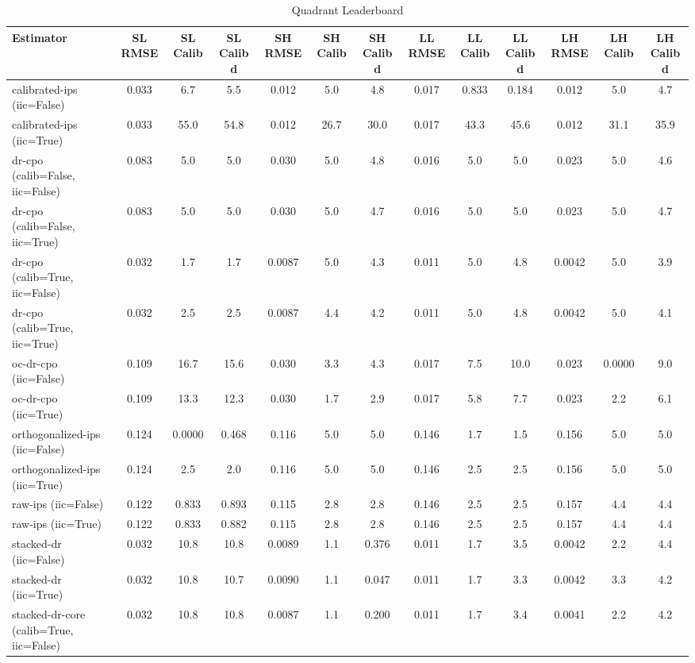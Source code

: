 \begin{table}[htbp]
\centering
\caption{Quadrant Leaderboard}
\label{tab:A1}
\begin{tabular}{l|cccccccccccc}
\toprule
Estimator & SL RMSE & SL Calib & SL Calib d & SH RMSE & SH Calib & SH Calib d & LL RMSE & LL Calib & LL Calib d & LH RMSE & LH Calib & LH Calib d \\
\midrule
calibrated-ips (iic=False) & 0.033 & 6.7 & 5.5 & 0.012 & 5.0 & 4.8 & 0.017 & 0.833 & 0.184 & 0.012 & 5.0 & 4.7 \\
calibrated-ips (iic=True) & 0.033 & 55.0 & 54.8 & 0.012 & 26.7 & 30.0 & 0.017 & 43.3 & 45.6 & 0.012 & 31.1 & 35.9 \\
dr-cpo (calib=False, iic=False) & 0.083 & 5.0 & 5.0 & 0.030 & 5.0 & 4.8 & 0.016 & 5.0 & 5.0 & 0.023 & 5.0 & 4.6 \\
dr-cpo (calib=False, iic=True) & 0.083 & 5.0 & 5.0 & 0.030 & 5.0 & 4.7 & 0.016 & 5.0 & 5.0 & 0.023 & 5.0 & 4.7 \\
dr-cpo (calib=True, iic=False) & 0.032 & 1.7 & 1.7 & 0.0087 & 5.0 & 4.3 & 0.011 & 5.0 & 4.8 & 0.0042 & 5.0 & 3.9 \\
dr-cpo (calib=True, iic=True) & 0.032 & 2.5 & 2.5 & 0.0087 & 4.4 & 4.2 & 0.011 & 5.0 & 4.8 & 0.0042 & 5.0 & 4.1 \\
oc-dr-cpo (iic=False) & 0.109 & 16.7 & 15.6 & 0.030 & 3.3 & 4.3 & 0.017 & 7.5 & 10.0 & 0.023 & 0.0000 & 9.0 \\
oc-dr-cpo (iic=True) & 0.109 & 13.3 & 12.3 & 0.030 & 1.7 & 2.9 & 0.017 & 5.8 & 7.7 & 0.023 & 2.2 & 6.1 \\
orthogonalized-ips (iic=False) & 0.124 & 0.0000 & 0.468 & 0.116 & 5.0 & 5.0 & 0.146 & 1.7 & 1.5 & 0.156 & 5.0 & 5.0 \\
orthogonalized-ips (iic=True) & 0.124 & 2.5 & 2.0 & 0.116 & 5.0 & 5.0 & 0.146 & 2.5 & 2.5 & 0.156 & 5.0 & 5.0 \\
raw-ips (iic=False) & 0.122 & 0.833 & 0.893 & 0.115 & 2.8 & 2.8 & 0.146 & 2.5 & 2.5 & 0.157 & 4.4 & 4.4 \\
raw-ips (iic=True) & 0.122 & 0.833 & 0.882 & 0.115 & 2.8 & 2.8 & 0.146 & 2.5 & 2.5 & 0.157 & 4.4 & 4.4 \\
stacked-dr (iic=False) & 0.032 & 10.8 & 10.8 & 0.0089 & 1.1 & 0.376 & 0.011 & 1.7 & 3.5 & 0.0042 & 2.2 & 4.4 \\
stacked-dr (iic=True) & 0.032 & 10.8 & 10.7 & 0.0090 & 1.1 & 0.047 & 0.011 & 1.7 & 3.3 & 0.0042 & 3.3 & 4.2 \\
stacked-dr-core (calib=True, iic=False) & 0.032 & 10.8 & 10.8 & 0.0087 & 1.1 & 0.200 & 0.011 & 1.7 & 3.4 & 0.0041 & 2.2 & 4.2 \\

\end{tabular}
\end{table}
